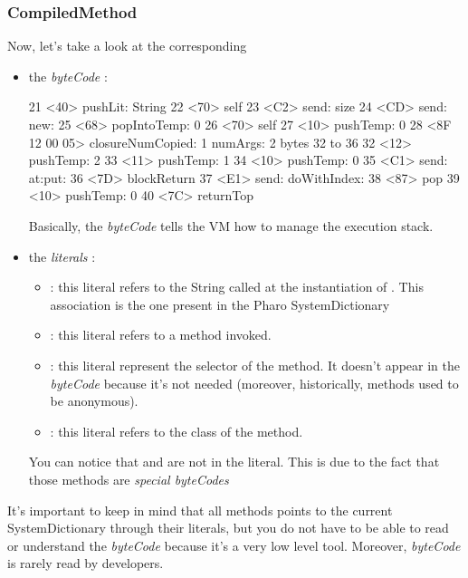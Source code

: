 \subsubsection*{CompiledMethod}
Now, let's take a look at the corresponding 
\begin{itemize}
	\item the \emph{byteCode} : 
	\begin{code}{}
		21 <40> pushLit: String
		22 <70> self
		23 <C2> send: size
		24 <CD> send: new:
		25 <68> popIntoTemp: 0
		26 <70> self
		27 <10> pushTemp: 0
		28 <8F 12 00 05> closureNumCopied: 1 numArgs: 2 bytes 32 to 36
		32 	<12> pushTemp: 2
		33 	<11> pushTemp: 1
		34 	<10> pushTemp: 0
		35 	<C1> send: at:put:
		36 	<7D> blockReturn
		37 <E1> send: doWithIndex:
		38 <87> pop
		39 <10> pushTemp: 0
		40 <7C> returnTop
	\end{code}
	Basically, the \emph{byteCode} tells the \gls{VM} how to manage the execution stack. 
		\item the \emph{literals} : 
		\begin{itemize}
			\item {} : this literal refers to the String called at the instantiation of . This association is the one present in the \gls{Pharo} SystemDictionary
			\item {} : this literal refers to a method invoked.
			\item {} : this literal represent the selector of the method. It doesn't appear in the \emph{byteCode} because it's not needed (moreover, historically, methods used to be anonymous).
			\item {} : this literal refers to the class of the method.
		\end{itemize}
		You can notice that  and  are not in the literal. This is due to the fact that those methods are \emph{special byteCodes}
\end{itemize}

It's important to keep in mind that all methods points to the current SystemDictionary through their literals, but you do not have to be able to read or understand the \emph{byteCode} because it's a very low level tool. Moreover, \emph{byteCode} is rarely read by developers.
